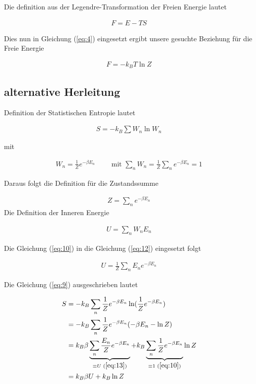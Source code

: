 Die definition aus der Legendre-Transformation der Freien Energie lautet

\begin{align}
  \label{eq:5}
  F = E - TS
\end{align}

Dies nun in Gleichung (\ref{eq:4}) eingesetzt ergibt unsere gesuchte Beziehung für die Freie Energie

\begin{align}
  \label{eq:6}
\boxed{  F =  - k_B T \ln Z }
\end{align}


\subsection*{alternative Herleitung}

Definition der Statistischen Entropie lautet

\begin{align}
  \label{eq:9}
  S = - k_B\sum W_n \ln W_n
\end{align}

mit

\begin{align}
  \label{eq:10}
  W_n = \frac{1}{Z}e^{-\beta E_n}\qquad \text{ mit } \sum_n W_n = \frac{1}{Z}\sum_ne^{-\beta E_n} = 1
\end{align}

Daraus folgt die Definition für die Zustandssumme

\begin{align}
  \label{eq:11}
  Z = \sum_n e^{-\beta E_n}
\end{align}
Die Definition der Inneren Energie

\begin{align}
  \label{eq:12}
  U = \sum_n W_n E_n
\end{align}

Die Gleichung (\ref{eq:10}) in die Gleichung (\ref{eq:12}) eingesetzt folgt

\begin{align}
  \label{eq:13}
  U = \frac{1}{Z}\sum_n E_ne^{-\beta E_n}
\end{align}

Die Gleichung (\ref{eq:9}) ausgeschrieben lautet

\begin{align}
  \label{eq:15}
  S &= -k_B \sum_n \frac{1}{Z}e^{-\beta E_n} \ln(\frac{1}{Z}e^{-\beta E_n}) \notag\\
&= -k_B \sum_n \frac{1}{Z}e^{-\beta E_n} (-\beta E_n - \ln Z ) \notag\\
&= k_B \beta \underbr{\sum_n \frac{E_n}{Z}e^{-\beta E_n}}_{\equiv U\,\, (\ref{eq:13})} + k_B \underbr{\sum_n \frac{1}{Z}e^{-\beta E_n}}_{\equiv 1\,\, (\ref{eq:10})} \ln Z  \notag\\
&= k_B \beta U + k_B \ln Z
\end{align}

